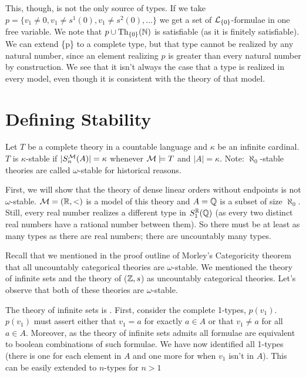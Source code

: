 This, though, is not the only source of types. 
If we take \(p = \{v_1 \neq 0, v_1 \neq s^1(0), v_1 \neq s^2(0), \ldots\}\) we get a set of \(\mathcal{L}_{\{0\}}\)-formulae in one free variable. 
We note that \(p \cup \text{Th}_{\{0\}}(\mathbb{N})\) is satisfiable (as it is finitely satisfiable). 
We can extend \{p\} to a complete type, but that type cannot be realized by any natural number, since an element realizing \(p\) is greater than every natural number by construction. 
We see that it isn't always the case that a type is realized in every model, even though it is consistent with the theory of that model. 

\section{Defining Stability}

\begin{definition}\label{def_stability}
Let \(T\) be a complete theory in a countable language and \(\kappa\) be an infinite cardinal. 
\(T\) is \(\kappa\)-stable if \(|S_n^{\mathcal{M}}(A)| = \kappa\) whenever \(\mathcal{M} \models T\) and \(|A| = \kappa\). 
Note: \(\aleph_0\)-stable theories are called \(\omega\)-stable for historical reasons. 
\end{definition}

First, we will show that the theory of dense linear orders without endpoints is not \(\omega\)-stable. 
\(\mathcal{M} = (\mathbb{R}, <)\) is a model of this theory and \(A = \mathbb{Q}\) is a subset of size \(\aleph_0\). 
Still, every real number realizes a different type in \(S_1^{\mathbb{R}}(\mathbb{Q})\) (as every two distinct real numbers have a rational number between them). 
So there must be at least as many types as there are real numbers; there are uncountably many types.  

Recall that we mentioned in the proof outline of Morley's Categoricity theorem that all uncountably categorical theories are \(\omega\)-stable. 
We mentioned the theory of infinite sets and the theory of (\(\mathbb{Z}, s\)) as uncountably categorical theories. 
Let's observe that both of these theories are \(\omega\)-stable. 

\begin{example}\label{example_omst_sets}
The theory of infinite sets is \omst. 
First, consider the complete 1-types, \(p(v_1)\). \(p(v_1)\) must assert either that \(v_1 = a\) for exactly \(a \in A\) or that \(v_1 \neq a\) for all \(a \in A\). 
Moreover, as the theory of infinite sets admits \qe all formulae are equivalent to boolean combinations of such formulae. %
We have now identified all 1-types (there is one for each element in \(A\) and one more for when \(v_1\) isn't in \(A\)). 
This can be easily extended to \(n\)-types for \(n > 1\)
\end{example}

